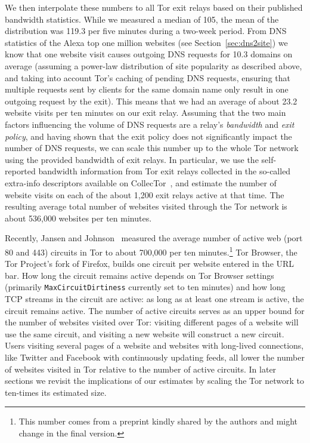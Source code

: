 We then interpolate these numbers to all Tor exit relays based on their
published bandwidth statistics.  While we measured a median of 105, 
the mean of the distribution was 119.3 per five minutes during a two-week period.
From DNS statistics of the Alexa top one million websites (see
Section~\ref{sec:dns2site}) we know that one website visit causes outgoing DNS requests for 10.3 domains on average
(assuming a power-law distribution of site popularity as described above, and
taking into account Tor's caching of pending DNS requests, ensuring that multiple
requests sent by clients for the same domain name only result in one outgoing request
by the exit).
This means that we had an average of about 23.2 website visits per ten
minutes on our exit relay.  Assuming that the two main factors influencing the
volume of DNS requests are a relay's \emph{bandwidth} and \emph{exit policy},
and having shown that the exit policy does not significantly impact
the number of DNS requests, we can scale this number up to the whole Tor network
using the provided bandwidth of exit relays.  In particular, we use the
self-reported bandwidth information from Tor exit
relays collected in the so-called extra-info descriptors available on
CollecTor~\cite{collector}, and estimate the number of website visits on
each of the about 1,200 exit relays active at that time. The resulting average
total number of websites visited through the Tor network is about 536,000
websites per ten minutes.

Recently, Jansen and Johnson~\cite{Jansen2016a} measured the average
number of active web (port 80 and 443) circuits in Tor to about 700,000 per ten
minutes.\footnote{This number comes from a preprint kindly
shared by the authors and might change in the final version.}
Tor Browser, the Tor Project's fork of Firefox, builds one circuit per
website entered in the URL bar. How long the circuit remains active depends on
Tor Browser settings (primarily {\tt MaxCircuitDirtiness} currently set to ten minutes) and how
long TCP streams in the circuit are active: as long as at least one stream is
active, the circuit remains active. The number of active circuits serves as an
upper bound for the number of websites visited over Tor: visiting different
pages of a website will use the same circuit, and visiting a new website will
construct a new circuit. Users visiting several pages of a website and websites
with long-lived connections, like Twitter and Facebook with continuously
updating feeds,
all lower the number of websites visited in Tor relative to the number of active
circuits. In later sections we revisit the implications of our estimates by
scaling the Tor network to ten-times its estimated size.

